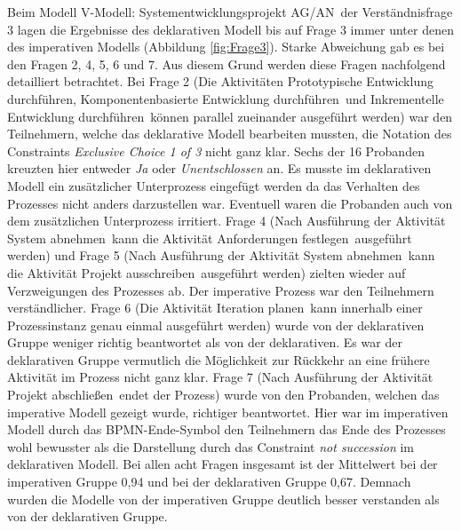 Beim Modell \grqq V-Modell: Systementwicklungsprojekt AG/AN\grqq \ der Verständnisfrage 3 lagen die Ergebnisse des deklarativen Modell bis auf Frage 3 immer unter denen des imperativen Modells (Abbildung \ref{fig:Frage3}). Starke Abweichung gab es bei den Fragen 2, 4, 5, 6 und 7. Aus diesem Grund werden diese Fragen nachfolgend detailliert betrachtet. \newline
Bei Frage 2 (\grqq Die Aktivitäten \grqq Prototypische Entwicklung durchführen\grqq, \grqq Komponentenbasierte Entwicklung durchführen\grqq \ und \grqq Inkrementelle Entwicklung durchführen\grqq \ können parallel zueinander ausgeführt werden\grqq) war den Teilnehmern, welche das deklarative Modell bearbeiten mussten, die Notation des Constraints \textit {Exclusive Choice 1 of 3} nicht ganz klar. Sechs der 16 Probanden kreuzten hier entweder \textit{Ja} oder \textit{Unentschlossen} an. Es musste im deklarativen Modell ein zusätzlicher Unterprozess eingefügt werden da das Verhalten des Prozesses nicht anders darzustellen war. Eventuell waren die Probanden auch von dem zusätzlichen Unterprozess irritiert.\newline
Frage 4 (\grqq Nach Ausführung der Aktivität \grqq System abnehmen\grqq \ kann die Aktivität \grqq Anforderungen festlegen\grqq \ ausgeführt werden\grqq) und Frage 5 (\grqq Nach Ausführung der Aktivität \grqq System abnehmen\grqq \ kann die Aktivität \grqq Projekt ausschreiben\grqq \ ausgeführt werden\grqq) zielten wieder auf Verzweigungen des Prozesses ab. Der imperative Prozess war den Teilnehmern verständlicher. \newline
Frage 6 (\grqq Die Aktivität \grqq Iteration planen\grqq \ kann innerhalb einer Prozessinstanz genau einmal ausgeführt werden\grqq) wurde von der deklarativen Gruppe weniger richtig beantwortet als von der deklarativen. Es war der deklarativen Gruppe vermutlich die Möglichkeit zur Rückkehr an eine frühere Aktivität im Prozess nicht ganz klar. \newline
Frage 7 (\grqq Nach Ausführung der Aktivität \grqq Projekt abschließen\grqq \ endet der Prozess\grqq) wurde von den Probanden, welchen das imperative Modell gezeigt wurde, richtiger beantwortet. Hier war im imperativen Modell durch das BPMN-Ende-Symbol den Teilnehmern das Ende des Prozesses wohl bewusster als die Darstellung durch das Constraint \textit{not succession} im deklarativen Modell.\newline
Bei allen acht Fragen insgesamt ist der Mittelwert bei der imperativen Gruppe 0,94 und bei der deklarativen Gruppe 0,67. Demnach wurden die Modelle von der imperativen Gruppe deutlich besser verstanden als von der deklarativen Gruppe. \newline


